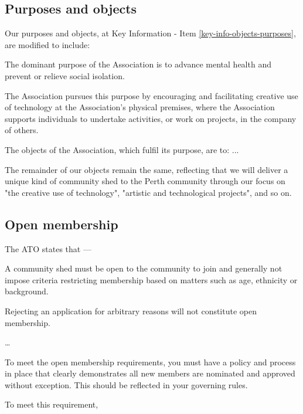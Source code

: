 \documentclass[../constitution.tex]{subfiles}
\begin{document}
\subsection*{Purposes and objects}

Our purposes and objects, at Key Information - Item \ref{key-info-objects-purposes}, are modified to include:

\begin{displayquote}
    The dominant purpose of the Association is to advance mental health and prevent or relieve social isolation.

    The Association pursues this purpose by encouraging and facilitating creative use of technology at the Association's physical premises, where the Association supports individuals to undertake activities, or work on projects, in the company of others.

    The objects of the Association, which fulfil its purpose, are to: ...
\end{displayquote}

The remainder of our objects remain the same, reflecting that we will deliver a unique kind of community shed to the Perth community through our focus on "the creative use of technology", "artistic and technological projects", and so on.

\subsection*{Open membership}

The ATO states that ---

\begin{displayquote}

    A community shed must be open to the community to join and generally not impose criteria restricting membership based on matters such as age, ethnicity or background.

    Rejecting an application for arbitrary reasons will not constitute open membership.

    \dots

    To meet the open membership requirements, you must have a policy and process in place that clearly demonstrates all new members are nominated and approved without exception. This should be reflected in your governing rules.

\end{displayquote}

\bigskip

To meet this requirement,
\end{document}

